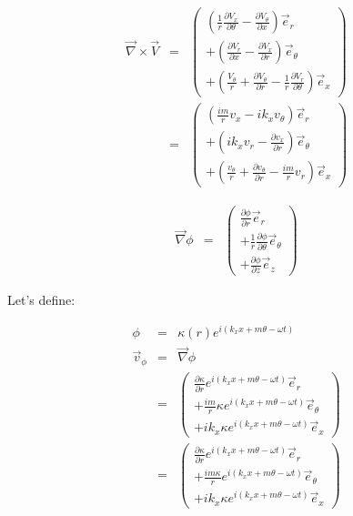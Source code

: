 \documentclass[12pt]{article}
\begin{document}
\begin{eqnarray}
\vec{\nabla} \times \vec{V}
&=&
\left(
\begin{array}{r}
\left(
\frac{1}{r}
\frac{\partial V_x}{\partial \theta}
-
\frac{\partial V_{\theta}}{\partial x}
\right) \vec{e}_r
\\
+\left(
\frac{\partial V_r}{\partial x}
-
\frac{\partial V_x}{\partial r}
\right) \vec{e}_{\theta}
\\
+\left(
\frac{V_{\theta}}{r}
+\frac{\partial V_{\theta}}{\partial r}
-
\frac{1}{r}
\frac{\partial V_{r}}{\partial \theta}
\right) \vec{e}_x
\end{array}
\right)
\nonumber
\\
&=&
\left(
\begin{array}{r}
\left(
\frac{i m}{r}
v_x
-
i k_x v_{\theta}
\right) \vec{e}_r
\\
+\left(
i k_x v_r
-
\frac{\partial v_x}{\partial r}
\right) \vec{e}_{\theta}
\\
+\left(
\frac{v_{\theta}}{r}
+\frac{\partial v_{\theta}}{\partial r}
-
\frac{i m}{r}
v_{r}
\right) \vec{e}_x
\end{array}
\right)
\nonumber
\end{eqnarray}

\begin{eqnarray}
\vec{\nabla} \phi
&=&
\left(
\begin{array}{r}
\frac{\partial \phi}{\partial r} \vec{e}_r
\\
+\frac{1}{r} \frac{\partial \phi}{\partial \theta} \vec{e}_{\theta}
\\
+\frac{\partial \phi}{\partial z} \vec{e}_z
\end{array}
\right)
\nonumber
\end{eqnarray}

Let's define:

\begin{eqnarray}
\phi &=& \kappa \left(r \right) e^{i \left(k_x x + m \theta - \omega t \right)}
\nonumber
\\
\vec{v}_{\phi} &=& \vec{\nabla} \phi
\nonumber
\\
&=& 
\left(
\begin{array}{r}
\frac{\partial \kappa}{\partial r} e^{i \left(k_x x + m \theta - \omega t \right)} \vec{e}_r
\\
+\frac{i m}{r} \kappa e^{i \left(k_x x + m \theta - \omega t \right)} \vec{e}_{\theta}
\\
+i k_x \kappa e^{i \left(k_x x + m \theta - \omega t \right)} \vec{e}_x
\end{array}
\right)
\nonumber
\\
&=& 
\left(
\begin{array}{r}
\frac{\partial \kappa}{\partial r} e^{i \left(k_x x + m \theta - \omega t \right)} \vec{e}_r
\\
+\frac{i m \kappa}{r} e^{i \left(k_x x + m \theta - \omega t \right)} \vec{e}_{\theta}
\\
+i k_x \kappa e^{i \left(k_x x + m \theta - \omega t \right)} \vec{e}_x
\end{array}
\right)
\nonumber
\end{eqnarray}
\end{document}
